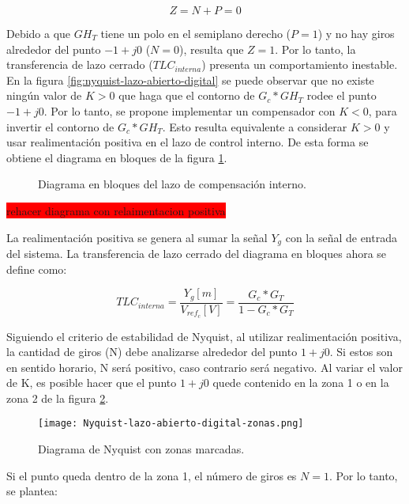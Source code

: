 \begin{equation}\label{eq_condicion_Nyquist}
	Z=N+P=0
\end{equation}


Debido a que $GH_T$ tiene un polo en el semiplano derecho ($P=1$) y no hay giros alrededor del punto $-1+j0$ ($N=0$), resulta que $Z=1$. Por lo tanto, la transferencia de lazo cerrado ($TLC_{interna}$) presenta un comportamiento inestable. En la figura \ref{fig:nyquist-lazo-abierto-digital} se puede observar que no existe ningún valor de $K>0$ que haga que el contorno de $G_c*GH_T$ rodee el punto $-1+j0$. Por lo tanto, se propone implementar un compensador con $K<0$, para invertir el contorno de $G_c*GH_T$. Esto resulta equivalente a considerar $K>0$ y usar realimentación positiva en el lazo de control interno. De esta forma se obtiene el diagrama en bloques de la figura \ref{fig:diag-interno_dig_realimentacion_positiva}.


\begin{figure}[H]
	\centering
	
	\caption{Diagrama en bloques del lazo de compensación interno.}	\label{fig:diag-interno_dig_realimentacion_positiva}
\end{figure}

\colorbox{red}{rehacer diagrama con relaimentacion positiva}

La realimentación positiva se genera al sumar la señal $Y_g$ con la señal de entrada del sistema. La transferencia de lazo cerrado del diagrama en bloques ahora se define como:

\begin{equation}
	TLC_{interna}=\frac{Y_g[m]}{V_{ref_c}[V]}=\frac{G_c*G_T}{1-G_c*G_T}
\end{equation}

Siguiendo el criterio de estabilidad de Nyquist, al utilizar realimentación positiva, la cantidad de giros (N) debe analizarse alrededor del punto $1+j0$. Si estos son en sentido horario, N será positivo, caso contrario será negativo. Al variar el valor de K, es posible hacer que el punto $1+j0$ quede contenido en la zona 1 o en la zona 2 de la figura \ref{fig:nyquist-con-zonas_digital}. 

\begin{figure}[H]
	\centering
	\texttt{[image: Nyquist-lazo-abierto-digital-zonas.png]}
	\caption{Diagrama de Nyquist con zonas marcadas.}
	\label{fig:nyquist-con-zonas_digital}
\end{figure}

Si el punto queda dentro de la zona 1, el número de giros es $N=1$. Por lo tanto, se plantea:


